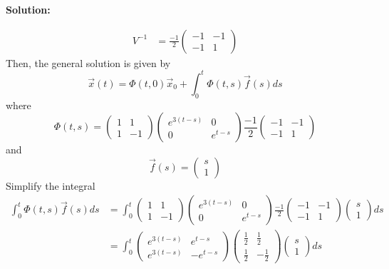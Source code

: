 \documentclass[12pt]{article}
\newenvironment{solution}{
    \textbf{Solution:}
    
}{
    
    \vspace{2em}
}
\begin{document}
\begin{solution}
\[\begin{aligned}
            V^{-1} &= \frac{-1}{2}\begin{pmatrix} -1 & -1 \\ -1 & 1 \end{pmatrix}
        \end{aligned}
    \]
    Then, the general solution is given by
    \[
        \vec{x}(t) = \Phi(t,0) \vec{x}_0 + \int_0^t \Phi(t,s) \vec{f}(s) ds
    \]
    where
    \[
        \Phi(t,s) = \begin{pmatrix} 1 & 1 \\ 1 & -1 \end{pmatrix} \begin{pmatrix} e^{3(t-s)} & 0 \\ 0 & e^{t-s} \end{pmatrix} \frac{-1}{2}\begin{pmatrix} -1 & -1 \\ -1 & 1 \end{pmatrix}
    \]
    and
    \[
        \vec{f}(s) = \begin{pmatrix} s \\ 1 \end{pmatrix}
    \]
    Simplify the integral
    \[
        \begin{aligned}
            \int_0^t \Phi(t,s) \vec{f}(s) ds &= \int_0^t \begin{pmatrix} 1 & 1 \\ 1 & -1 \end{pmatrix} \begin{pmatrix} e^{3(t-s)} & 0 \\ 0 & e^{t-s} \end{pmatrix} \frac{-1}{2}\begin{pmatrix} -1 & -1 \\ -1 & 1 \end{pmatrix} \begin{pmatrix} s \\ 1 \end{pmatrix} ds \\
            &= \int_0^t \begin{pmatrix} e^{3(t-s)} & e^{t-s} \\ e^{3(t-s)} & -e^{t-s} \end{pmatrix} \begin{pmatrix} \frac{1}{2} & \frac{1}{2} \\ \frac{1}{2} & -\frac{1}{2} \end{pmatrix} \begin{pmatrix} s \\ 1 \end{pmatrix} ds \\

\end{aligned}\]
\end{solution}
\end{document}
